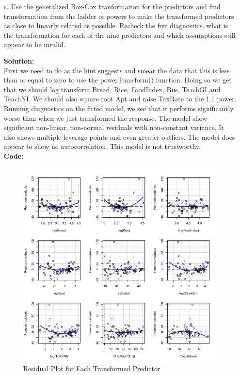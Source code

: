 \documentclass[12pt]{article}
\makeatletter
\theoremstyle{homework}
\newenvironment{exercise}[1]
{\def\@currentlabel{#1}\exercisecore}
{\endexercisecore}
\newcommand{\localhead}[1]{\par\smallskip\noindent\textbf{#1}\nobreak\\}%
\newcommand\solution{\localhead{Solution:}}
\makeatother
\begin{document}
\begin{exercise}{1}
\begin{enumerate}
      \item[c.] Use the generalized Box-Cox tranformaiton for the predictors and find transformation from the 
      ladder of powers to make the transformed predictors as close to linearly related as possible. Recheck the five diagnostics. what is 
      the transformation for each of the nine predictors and which assumptions still appear to be invalid. \\
      \solution  First we need to do as the hint suggests and smear the data that this is less than or equal to zero to use the 
      powerTransform() function. Doing so we get that we should log transform Bread, Rice, FoodIndex, Bus, TeachGI and TeachNI. We should also 
      square root Apt and raise TaxRate to the 1.1 power. Running diagnostics on the fitted model, we see that it performs significantly worse than 
      when we just transformed the response. The model show significant non-linear, non-normal residuals with non-constant variance. It also shows multiple leverage points and 
      even greater outliers. The model does appear to show no autocorrelation. This model is not trustworthy.\\
      \textbf{Code:}
      \begin{center}
      
      \end{center} 
      \begin{figure}[H]
        \begin{center}
        \caption{Residual Plot for Each Transformed Predictor}
        \includegraphics[width = \textwidth]{Rplot06.png}

\end{center}
\end{figure}
\end{enumerate}
\end{exercise}
\end{document}
